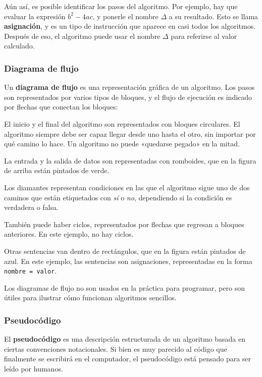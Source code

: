 Aún así, es posible identificar los pasos del algoritmo. Por ejemplo,
hay que evaluar la expresión \(b^2 - 4ac\), y ponerle el nombre \(\Delta\) a
su resultado. Esto se llama \textbf{asignación}, y es un tipo de
instrucción que aparece en casi todos los algoritmos. Después de eso, el
algoritmo puede usar el nombre \(\Delta\) para referirse al valor calculado.

\subsubsection{Diagrama de flujo}

Un \textbf{diagrama de flujo} es una representación gráfica de un
algoritmo. Los pasos son representados por varios tipos de bloques, y el
flujo de ejecución es indicado por flechas que conectan los bloques:


El inicio y el final del algoritmo son representados con bloques
circulares. El algoritmo siempre debe ser capaz llegar desde uno hasta
el otro, sin importar por qué camino lo hace. Un algoritmo no puede
«quedarse pegado» en la mitad.

La entrada y la salida de datos son representadas con romboides, que en
la figura de arriba están pintados de verde.

Los diamantes representan condiciones en las que el algoritmo sigue uno
de dos caminos que están etiquetados con \emph{sí} o \emph{no},
dependiendo si la condición es verdadera o falsa.

También puede haber ciclos, representados por flechas que regresan a
bloques anteriores. En este ejemplo, no hay ciclos.

Otras sentencias van dentro de rectángulos, que en la figura están
pintados de azul. En este ejemplo, las sentencias son asignaciones,
representadas en la forma \lstinline!nombre = valor!.

Los diagramas de flujo no son usados en la práctica para programar, pero
son útiles para ilustrar cómo funcionan algoritmos sencillos.

\subsubsection{Pseudocódigo}

El \textbf{pseudocódigo} es una descripción estructurada de un algoritmo
basada en ciertas convenciones notacionales. Si bien es muy parecido al
código que finalmente se escribirá en el computador, el pseudocódigo
está pensado para ser leído por humanos.

